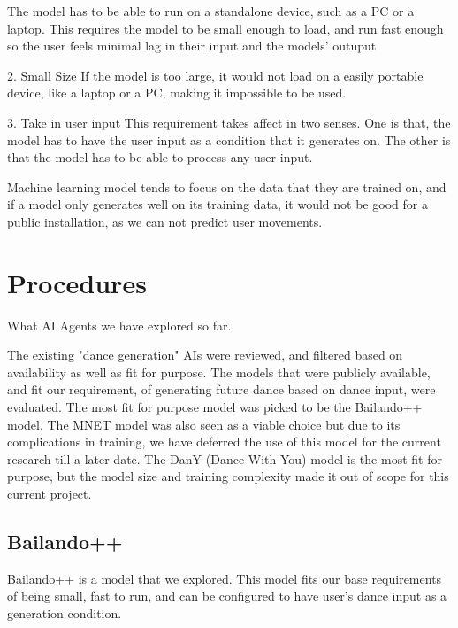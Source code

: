 \documentclass[final,5p,times,authoryear]{article}
\begin{document}
The model has to be able to run on a standalone device, such as a PC or a
laptop. This requires the model to be small enough to load, and run fast enough
so the user feels minimal lag in their input and the models' outuput

2. Small Size
If the model is too large, it would not load on a easily portable device, like a
laptop or a PC, making it impossible to be used.

3. Take in user input
This requirement takes affect in two senses. One is that, the model has to have
the user input as a condition that it generates on. The other is that the model
has to be able to process any user input.

Machine learning model tends to focus on the data that they are trained on, and
if a model only generates well on its training data, it would not be good for a
public installation, as we can not predict user movements.

\section{Procedures}

What AI Agents we have explored so far.

The existing "dance generation" AIs were reviewed, and filtered based on
availability as well as fit for purpose. The models that were publicly
available, and fit our requirement, of generating future dance based on dance
input, were evaluated. The most fit for purpose model was picked to be the
Bailando++ model. The MNET model was also seen as a viable choice but due to its
complications in training, we have deferred the use of this model for the
current research till a later date. The DanY (Dance With You) model is the most
fit for purpose, but the model size and training complexity made it out of scope
for this current project.

\subsection{Bailando++}

Bailando++ is a model that we explored. This model fits our base requirements of
being small, fast to run, and can be configured to have user's dance input as a
generation condition.
\end{document}
